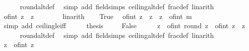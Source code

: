 \begin{isabellebody}
\ \ \ \ \isamarkupfalse%
\ round{\isacharunderscore}{\kern0pt}altdef\ \isamarkupfalse%
\ {\isacharparenleft}{\kern0pt}simp\ add{\isacharcolon}{\kern0pt}\ field{\isacharunderscore}{\kern0pt}simps\ ceiling{\isacharunderscore}{\kern0pt}altdef\ frac{\isacharunderscore}{\kern0pt}def{\isacharparenright}{\kern0pt}\ linarith\isanewline
\ \ \isamarkupfalse%
\ \isamarkupfalse%
\ {\isachardoublequoteopen}of{\isacharunderscore}{\kern0pt}int\ {\isasymlceil}z{\isasymrceil}\ {\isacharminus}{\kern0pt}\ z\ {\isasymge}\ {}{\isachardoublequoteclose}\isanewline
\ \ \ \ \isamarkupfalse%
\ linarith\isanewline
\ \ \isamarkupfalse%
\ True\ \isamarkupfalse%
\ {\isachardoublequoteopen}{\isasymbar}of{\isacharunderscore}{\kern0pt}int\ {\isasymlceil}z{\isasymrceil}\ {\isacharminus}{\kern0pt}\ z{\isasymbar}\ {\isasymle}\ {\isasymbar}z\ {\isacharminus}{\kern0pt}\ of{\isacharunderscore}{\kern0pt}int\ m{\isasymbar}{\isachardoublequoteclose}\isanewline
\ \ \ \ \isamarkupfalse%
\ {\isacharparenleft}{\kern0pt}simp\ add{\isacharcolon}{\kern0pt}\ ceiling{\isacharunderscore}{\kern0pt}le{\isacharunderscore}{\kern0pt}iff{\isacharparenright}{\kern0pt}\isanewline
\ \ \isamarkupfalse%
\ \isamarkupfalse%
\ {\isacharquery}{\kern0pt}thesis\ \isacommand{{\isachardot}{\kern0pt}}\isamarkupfalse%
\isanewline
{}\isamarkupfalse%
\isanewline
\ \ \isamarkupfalse%
\ False\isanewline
\ \ \isamarkupfalse%
\ \isamarkupfalse%
\ {\isachardoublequoteopen}{\isasymbar}z\ {\isacharminus}{\kern0pt}\ of{\isacharunderscore}{\kern0pt}int\ {\isacharparenleft}{\kern0pt}round\ z{\isacharparenright}{\kern0pt}{\isasymbar}\ {\isasymle}\ {\isasymbar}of{\isacharunderscore}{\kern0pt}int\ {\isasymlfloor}z{\isasymrfloor}\ {\isacharminus}{\kern0pt}\ z{\isasymbar}{\isachardoublequoteclose}\isanewline
\ \ \ \ \isamarkupfalse%
\ round{\isacharunderscore}{\kern0pt}altdef\ \isamarkupfalse%
\ {\isacharparenleft}{\kern0pt}simp\ add{\isacharcolon}{\kern0pt}\ field{\isacharunderscore}{\kern0pt}simps\ ceiling{\isacharunderscore}{\kern0pt}altdef\ frac{\isacharunderscore}{\kern0pt}def{\isacharparenright}{\kern0pt}\ linarith\isanewline
\ \ \isamarkupfalse%
\ \isamarkupfalse%
\ {\isachardoublequoteopen}z\ {\isacharminus}{\kern0pt}\ of{\isacharunderscore}{\kern0pt}int\ {\isasymlfloor}z{\isasymrfloor}\ {\isasymge}\ {}{\isachardoublequoteclose}\isanewline

\end{isabellebody}
